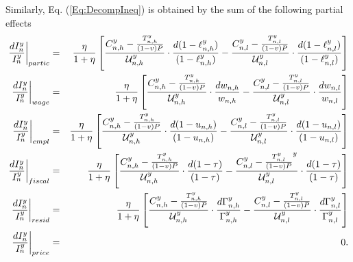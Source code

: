 \documentclass[a4paper,12pt]{article}
\begin{document}
Similarly, Eq. (\ref{Eq:DecompIneq}) is obtained by the sum of the following partial effects
\begin{eqnarray*}
\left. \frac{dI_{n}^{y}}{I_{n}^{y}}\right \vert _{partic} &=& \frac{\eta}{1+\eta} \left[
\frac{C_{n,h}^{y}-\frac{T_{n,h}^{y}}{(1-v)P}}{\mathcal{U}_{n,h}^{y}}\cdot \frac{d(1-\ell _{n,h}^{y})}{(1-\ell _{n,h}^{y})}-\frac{C_{n,l}^{y}-\frac{T_{n,l}^{y}}{(1-v)P}}{\mathcal{U}_{n,l}^{y}}\cdot \frac{d(1-\ell _{n,l}^{y})}{(1-\ell _{n,l}^{y})} \right] \\
\left. \frac{dI_{n}^{y}}{I_{n}^{y}}\right \vert _{wage} &=& \frac{\eta}{1+\eta} \left[
\frac{C_{n,h}^{y}-\frac{T_{n,h}^{y}}{(1-v)P}}{\mathcal{U}_{n,h}^{y}}\cdot \frac{dw_{n,h}}{w_{n,h}}-\frac{C_{n,l}^{y} -\frac{T_{n,l}^{y}}{(1-v)P}}{\mathcal{U}_{n,l}^{y}}\cdot \frac{dw_{n,l}}{w_{n,l}} \right] \\
\left. \frac{dI_{n}^{y}}{I_{n}^{y}}\right \vert _{empl} &=& \frac{\eta}{1+\eta} \left[
\frac{C_{n,h}^{y}-\frac{T_{n,h}^{y}}{(1-v)P}}{\mathcal{U}_{n,h}^{y}}\cdot \frac{d(1-u_{n,h})}{(1-u_{n,h})} -\frac{C_{n,l}^{y}-\frac{T_{n,l}^{y}}{(1-v)P}}{\mathcal{U}_{n,l}^{y}}\cdot \frac{d(1-u_{n,l})}{%
(1-u_{n,l})} \right] \\
\left. \frac{dI_{n}^{y}}{I_{n}^{y}}\right \vert _{fiscal} &=& \frac{\eta}{1+\eta} \left[
\frac{C_{n,h}^{y}-\frac{T_{n,h}^{y}}{(1-v)P}}{\mathcal{U}_{n,h}^{y}}\cdot \frac{d(1-\tau )}{(1-\tau )}
- \frac{C_{n,l}^{y}-\frac{T_{n,l}^{y}}{(1-v)P}^{y}}{\mathcal{U}_{n,l}^{y}}\cdot \frac{d(1-\tau )}{(1-\tau )} \right] \\
\left. \frac{dI_{n}^{y}}{I_{n}^{y}}\right \vert _{resid} &=& \frac{\eta}{1+\eta} \left[
\frac{C_{n,h}^{y}-\frac{T_{n,h}^{y}}{(1-v)P}}{\mathcal{U}_{n,h}^{y}}\cdot \frac{d\Gamma_{n,h}^{y}}{\Gamma_{n,h}^{y}}
-\frac{C_{n,l}^{y}-\frac{T_{n,l}^{y}}{(1-v)P}}{\mathcal{U}_{n,l}^{y}}\cdot \frac{d\Gamma_{n,l}^{y}}{\Gamma _{n,l}^{y}} \right] \\
\left. \frac{dI_{n}^{y}}{I_{n}^{y}}\right \vert _{price} &=& 0.
\end{eqnarray*}
\end{document}
